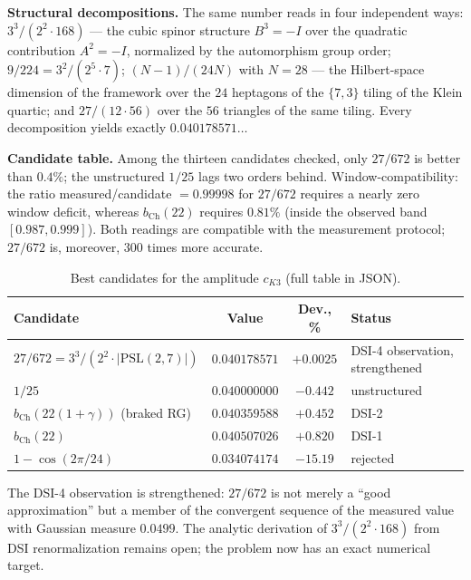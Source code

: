 \documentclass[11pt,a4paper]{article}
\begin{document}
\textbf{Structural decompositions.} The same number reads in four independent
ways: $3^3/(2^2\cdot168)$ --- the cubic spinor structure $B^3 = -I$ over the
quadratic contribution $A^2 = -I$, normalized by the automorphism group order;
$9/224 = 3^2/(2^5\cdot 7)$; $(N-1)/(24N)$ with $N = 28$ --- the Hilbert-space
dimension of the framework over the $24$ heptagons of the $\{7,3\}$ tiling of
the Klein quartic; and $27/(12\cdot 56)$ over the $56$ triangles of the same
tiling. Every decomposition yields exactly $0.040178571\ldots$

\textbf{Candidate table.} Among the thirteen candidates checked, only $27/672$
is better than $0.4\%$; the unstructured $1/25$ lags two orders behind.
Window-compatibility: the ratio measured/candidate $= 0.99998$ for $27/672$
requires a nearly zero window deficit, whereas $b_{\mathrm{Ch}}(22)$ requires
$0.81\%$ (inside the observed band $[0.987, 0.999]$). Both readings are
compatible with the measurement protocol; $27/672$ is, moreover, $300$ times
more accurate.

\begin{table}[htbp]
\centering\small
\caption{Best candidates for the amplitude $c_{K3}$ (full table in JSON).}
\label{tab:cands}
\begin{tabularx}{\textwidth}{lccY}
\toprule
Candidate & Value & Dev., \% & Status \\
\midrule
$27/672 = 3^3/(2^2\cdot|\mathrm{PSL}(2,7)|)$ & $0.040178571$ & $+0.0025$ & DSI-4 observation, strengthened \\
$1/25$ & $0.040000000$ & $-0.442$ & unstructured \\
$b_{\mathrm{Ch}}(22(1+\gamma))$ (braked RG) & $0.040359588$ & $+0.452$ & DSI-2 \\
$b_{\mathrm{Ch}}(22)$ & $0.040507026$ & $+0.820$ & DSI-1 \\
$1-\cos(2\pi/24)$ & $0.034074174$ & $-15.19$ & rejected \\
\bottomrule
\end{tabularx}
\end{table}

\begin{findbox}[$9/224$ is a convergent]
The DSI-4 observation is strengthened: $27/672$ is not merely a ``good
approximation'' but a member of the convergent sequence of the measured value
with Gaussian measure $0.0499$. The analytic derivation of $3^3/(2^2\cdot168)$
from DSI renormalization remains open; the problem now has an exact numerical
target.
\end{findbox}
\end{document}
